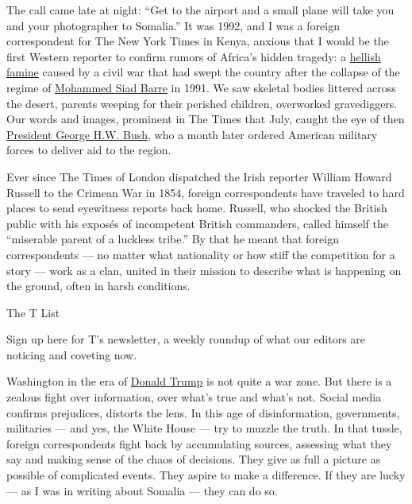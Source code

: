 The call came late at night: ``Get to the airport and a small plane will
take you and your photographer to Somalia.'' It was 1992, and I was a
foreign correspondent for The New York Times in Kenya, anxious that I
would be the first Western reporter to confirm rumors of Africa's hidden
tragedy: a
\href{https://www.nytimes.com/1992/07/19/world/deaths-in-somalia-outpace-delivery-of-food.html}{hellish
famine} caused by a civil war that had swept the country after the
collapse of the regime of
\href{https://www.nytimes.com/1995/01/03/obituaries/somalia-s-overthrown-dictator-mohammed-siad-barre-is-dead.html}{Mohammed
Siad Barre} in 1991. We saw skeletal bodies littered across the desert,
parents weeping for their perished children, overworked gravediggers.
Our words and images, prominent in The Times that July, caught the eye
of then
\href{https://www.nytimes.com/2018/11/30/us/politics/george-hw-bush-dies.html}{President
George H.W. Bush}, who a month later ordered American military forces to
deliver aid to the region.

Ever since The Times of London dispatched the Irish reporter William
Howard Russell to the Crimean War in 1854, foreign correspondents have
traveled to hard places to send eyewitness reports back home. Russell,
who shocked the British public with his exposés of incompetent British
commanders, called himself the ``miserable parent of a luckless tribe.''
By that he meant that foreign correspondents --- no matter what
nationality or how stiff the competition for a story --- work as a clan,
united in their mission to describe what is happening on the ground,
often in harsh conditions.

The T List \textbar{}

Sign up here for T's newsletter, a weekly roundup of what our editors
are noticing and coveting now.

Washington in the era of
\href{https://www.nytimes.com/topic/person/donald-trump}{Donald Trump}
is not quite a war zone. But there is a zealous fight over information,
over what's true and what's not. Social media confirms prejudices,
distorts the lens. In this age of disinformation, governments,
militaries --- and yes, the White House --- try to muzzle the truth. In
that tussle, foreign correspondents fight back by accumulating sources,
assessing what they say and making sense of the chaos of decisions. They
give as full a picture as possible of complicated events. They aspire to
make a difference. If they are lucky --- as I was in writing about
Somalia --- they can do so.

